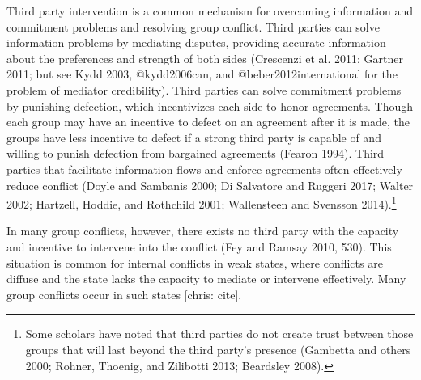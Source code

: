 \documentclass[11pt]{article}
\begin{document}
Third party intervention is a common mechanism for overcoming
information and commitment problems and resolving group conflict. Third
parties can solve information problems by mediating disputes, providing
accurate information about the preferences and strength of both sides
(Crescenzi et al. 2011; Gartner 2011; but see Kydd 2003, @kydd2006can,
and @beber2012international for the problem of mediator credibility).
Third parties can solve commitment problems by punishing defection,
which incentivizes each side to honor agreements. Though each group may
have an incentive to defect on an agreement after it is made, the groups
have less incentive to defect if a strong third party is capable of and
willing to punish defection from bargained agreements (Fearon 1994).
Third parties that facilitate information flows and enforce agreements
often effectively reduce conflict (Doyle and Sambanis 2000; Di Salvatore
and Ruggeri 2017; Walter 2002; Hartzell, Hoddie, and Rothchild 2001;
Wallensteen and Svensson 2014).\footnote{Some scholars have noted that
  third parties do not create trust between those groups that will last
  beyond the third party's presence (Gambetta and others 2000; Rohner,
  Thoenig, and Zilibotti 2013; Beardsley 2008).}

In many group conflicts, however, there exists no third party with the
capacity and incentive to intervene into the conflict (Fey and Ramsay
2010, 530). This situation is common for internal conflicts in weak
states, where conflicts are diffuse and the state lacks the capacity to
mediate or intervene effectively. Many group conflicts occur in such
states {[}chris: cite{]}.
\end{document}
